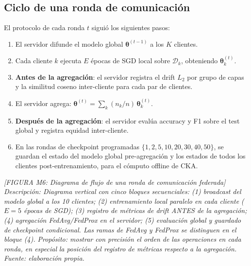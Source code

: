 \subsection{Ciclo de una ronda de comunicación}

El protocolo de cada ronda $t$ siguió los siguientes pasos:

\begin{enumerate}
  \item El servidor difunde el modelo global $\boldsymbol{\theta}^{(t-1)}$ a los $K$
    clientes.
  \item Cada cliente $k$ ejecuta $E$ épocas de SGD local sobre $\mathcal{D}_k$, obteniendo
    $\boldsymbol{\theta}_k^{(t)}$.
  \item \textbf{Antes de la agregación}: el servidor registra el drift $L_2$ por grupo de
    capas y la similitud coseno inter-cliente para cada par de clientes.
  \item El servidor agrega: $\boldsymbol{\theta}^{(t)} = \sum_k (n_k/n)\,
    \boldsymbol{\theta}_k^{(t)}$.
  \item \textbf{Después de la agregación}: el servidor evalúa accuracy y F1 sobre el test
    global y registra equidad inter-cliente.
  \item En las rondas de checkpoint programadas $\{1, 2, 5, 10, 20, 30, 40, 50\}$, se
    guardan el estado del modelo global pre-agregación y los estados de todos los clientes
    post-entrenamiento, para el cómputo offline de CKA.
\end{enumerate}

\begin{center}
\textit{[FIGURA M6: Diagrama de flujo de una ronda de comunicación federada]}\\
\textit{Descripción: Diagrama vertical con cinco bloques secuenciales: (1) broadcast del}
\textit{modelo global a los 10 clientes; (2) entrenamiento local paralelo en cada cliente}
\textit{($E=5$ épocas de SGD); (3) registro de métricas de drift ANTES de la agregación;}
\textit{(4) agregación FedAvg/FedProx en el servidor; (5) evaluación global y guardado de}
\textit{checkpoint condicional. Las ramas de FedAvg y FedProx se distinguen en el bloque (4).}
\textit{Propósito: mostrar con precisión el orden de las operaciones en cada ronda, en especial}
\textit{la posición del registro de métricas respecto a la agregación.}\\
\textit{Fuente: elaboración propia.}
\end{center}


